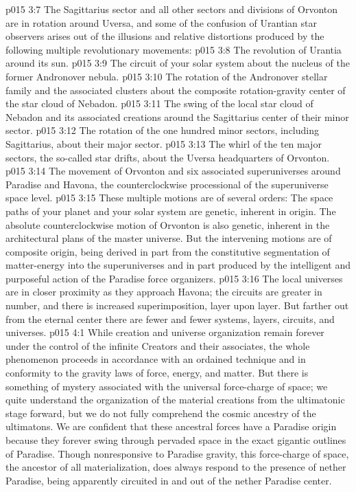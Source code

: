 \vs p015 3:7 \pc The Sagittarius sector and all other sectors and divisions of Orvonton are in rotation around Uversa, and some of the confusion of Urantian star observers arises out of the illusions and relative distortions produced by the following multiple revolutionary movements:
\vs p015 3:8 \bibnobreakspace The revolution of Urantia around its sun.
\vs p015 3:9 \bibnobreakspace The circuit of your solar system about the nucleus of the former Andronover nebula.
\vs p015 3:10 \bibnobreakspace The rotation of the Andronover stellar family and the associated clusters about the composite rotation\hyp{}gravity center of the star cloud of Nebadon.
\vs p015 3:11 \bibnobreakspace The swing of the local star cloud of Nebadon and its associated creations around the Sagittarius center of their minor sector.
\vs p015 3:12 \bibnobreakspace The rotation of the one hundred minor sectors, including Sagittarius, about their major sector.
\vs p015 3:13 \bibnobreakspace The whirl of the ten major sectors, the so\hyp{}called star drifts, about the Uversa headquarters of Orvonton.
\vs p015 3:14 \bibnobreakspace The movement of Orvonton and six associated superuniverses around Paradise and Havona, the counterclockwise processional of the superuniverse space level.
\vs p015 3:15 \pc These multiple motions are of several orders: The space paths of your planet and your solar system are genetic, inherent in origin. The absolute counterclockwise motion of Orvonton is also genetic, inherent in the architectural plans of the master universe. But the intervening motions are of composite origin, being derived in part from the constitutive segmentation of matter\hyp{}energy into the superuniverses and in part produced by the intelligent and purposeful action of the Paradise force organizers.
\vs p015 3:16 \pc The local universes are in closer proximity as they approach Havona; the circuits are greater in number, and there is increased superimposition, layer upon layer. But farther out from the eternal center there are fewer and fewer systems, layers, circuits, and universes.
\vs p015 4:1 While creation and universe organization remain forever under the control of the infinite Creators and their associates, the whole phenomenon proceeds in accordance with an ordained technique and in conformity to the gravity laws of force, energy, and matter. But there is something of mystery associated with the universal force\hyp{}charge of space; we quite understand the organization of the material creations from the ultimatonic stage forward, but we do not fully comprehend the cosmic ancestry of the ultimatons. We are confident that these ancestral forces have a Paradise origin because they forever swing through pervaded space in the exact gigantic outlines of Paradise. Though nonresponsive to Paradise gravity, this force\hyp{}charge of space, the ancestor of all materialization, does always respond to the presence of nether Paradise, being apparently circuited in and out of the nether Paradise center.
